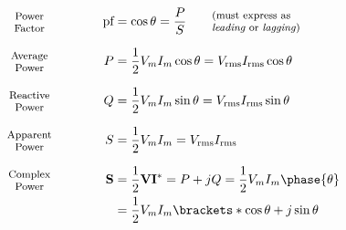 \begin{multicols}{2}
\begin{CheatsheetEntryFrame}
\begin{center}
        \end{center}
        \vspace*{-2ex}

        \begin{alignat*}{2}
            &\text{\parbox{3.5em}{\centering\footnotesize{}Power\\Factor}}
            &\qquad\quad \text{pf}
            &= \cos\theta
            = \frac{P}{S}
            \qquad \text{\parbox{7.5em}{\raggedright\footnotesize{}(must express as \emph{leading} or \emph{lagging})}}
            \\[0.7em]
            &\text{\parbox{3.5em}{\centering\footnotesize{}Average\\Power}}
            &\qquad\quad P
            &= \frac{1}{2} V_m I_m \cos{\theta}
            = V_{\text{rms}} I_{\text{rms}} \cos{\theta}
            \\[0.7em]
            &\text{\parbox{3.5em}{\centering\footnotesize{}Reactive\\Power}}
            &\qquad\quad Q
            &= \frac{1}{2} V_m I_m \sin{\theta}
            = V_{\text{rms}} I_{\text{rms}} \sin{\theta}
            \\[0.7em]
            &\text{\parbox{3.5em}{\centering\footnotesize{}Apparent\\Power}}
            &\qquad\quad S
            &= \frac{1}{2} V_m I_m
            = V_{\text{rms}} I_{\text{rms}}
            \\[0.7em]
            &\text{\parbox{3.5em}{\centering\footnotesize{}Complex\\Power}}
            &\qquad\quad \mathbf{S}
            &= \frac{1}{2} \mathbf{V} \mathbf{I}^*
            = P + j Q
            = \frac{1}{2} V_m I_m \phase{\theta}
            \\
            &&
            &= \frac{1}{2} V_m I_m \brackets*{\cos{\theta} + j \sin{\theta}}
        \end{alignat*}


\end{CheatsheetEntryFrame}
\end{multicols}
